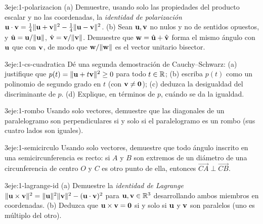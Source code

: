 \begin{ejercicio}{3}{eje:1-polarizacion}
(a) Demuestre, usando solo las propiedades del producto escalar y no las coordenadas, la \emph{identidad de polarización} $\mathbf{u}\cdot\mathbf{v}=\tfrac14\lVert\mathbf{u}+\mathbf{v}\rVert^2-\tfrac14\lVert\mathbf{u}-\mathbf{v}\rVert^2$. (b) Sean $\mathbf{u},\mathbf{v}$ no nulos y no de sentidos opuestos, y $\hat{\mathbf{u}}=\mathbf{u}/\lVert\mathbf{u}\rVert$, $\hat{\mathbf{v}}=\mathbf{v}/\lVert\mathbf{v}\rVert$. Demuestre que $\mathbf{w}=\hat{\mathbf{u}}+\hat{\mathbf{v}}$ forma el mismo ángulo con $\mathbf{u}$ que con $\mathbf{v}$, de modo que $\mathbf{w}/\lVert\mathbf{w}\rVert$ es el vector unitario bisector.
\end{ejercicio}

\begin{ejercicio}{3}{eje:1-cs-cuadratica}
Dé una segunda demostración de Cauchy--Schwarz: (a) justifique que $p(t)=\lVert\mathbf{u}+t\mathbf{v}\rVert^2\ge0$ para todo $t\in\mathbb{R}$; (b) escriba $p(t)$ como un polinomio de segundo grado en $t$ (con $\mathbf{v}\neq\mathbf{0}$); (c) deduzca la desigualdad del discriminante de $p$. (d) Explique, en términos de $p$, cuándo se da la igualdad.
\end{ejercicio}

\begin{ejercicio}{3}{eje:1-rombo}
Usando solo vectores, demuestre que las diagonales de un paralelogramo son perpendiculares si y solo si el paralelogramo es un rombo (sus cuatro lados son iguales).
\end{ejercicio}

\begin{ejercicio}{3}{eje:1-semicirculo}
Usando solo vectores, demuestre que todo ángulo inscrito en una semicircunferencia es recto: si $A$ y $B$ son extremos de un diámetro de una circunferencia de centro $O$ y $C$ es otro punto de ella, entonces $\overrightarrow{CA}\perp\overrightarrow{CB}$.
\end{ejercicio}

\begin{ejercicio}{3}{eje:1-lagrange-id}
(a) Demuestre la \emph{identidad de Lagrange} $\lVert\mathbf{u}\times\mathbf{v}\rVert^2=\lVert\mathbf{u}\rVert^2\lVert\mathbf{v}\rVert^2-(\mathbf{u}\cdot\mathbf{v})^2$ para $\mathbf{u},\mathbf{v}\in\mathbb{R}^3$ desarrollando ambos miembros en coordenadas. (b) Deduzca que $\mathbf{u}\times\mathbf{v}=\mathbf{0}$ si y solo si $\mathbf{u}$ y $\mathbf{v}$ son paralelos (uno es múltiplo del otro).
\end{ejercicio}
